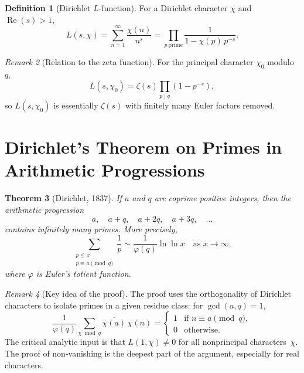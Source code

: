 \documentclass[12pt,a4paper,openany]{book}
\theoremstyle{definition}
\newtheorem{definition}{Definition}[chapter]
\theoremstyle{plain}
\newtheorem{theorem}[definition]{Theorem}
\theoremstyle{remark}
\newtheorem{remark}[definition]{Remark}
\begin{document}
\begin{definition}[Dirichlet $L$-function]
\label{def:dirichlet-L}
For a Dirichlet character $\chi$ and $\operatorname{Re}(s)>1$,
\[
  L(s, \chi) = \sum_{n=1}^{\infty} \frac{\chi(n)}{n^s}
  = \prod_{p\ \mathrm{prime}} \frac{1}{1 - \chi(p)\,p^{-s}}.
\]
\end{definition}

\begin{remark}[Relation to the zeta function]
\label{rem:L-to-zeta}
For the principal character $\chi_0$ modulo~$q$,
\[
  L(s, \chi_0) = \zeta(s) \prod_{p \mid q}(1 - p^{-s}),
\]
so $L(s, \chi_0)$ is essentially $\zeta(s)$ with finitely many Euler factors
removed.
\end{remark}


\section{Dirichlet's Theorem on Primes in Arithmetic Progressions}
\label{sec:dirichlet-theorem}

\begin{theorem}[Dirichlet, 1837]
\label{thm:dirichlet-primes-AP}
If $a$ and $q$ are coprime positive integers, then the arithmetic progression
\[
  a,\quad a + q,\quad a + 2q,\quad a + 3q,\quad \ldots
\]
contains infinitely many primes. More precisely,
\[
  \sum_{\substack{p \leq x \\ p \equiv a \pmod{q}}} \frac{1}{p}
  \sim \frac{1}{\varphi(q)} \ln\ln x
  \quad\text{as } x \to \infty,
\]
where $\varphi$ is Euler's totient function.
\end{theorem}

\begin{remark}[Key idea of the proof]
\label{rem:dirichlet-proof-idea}
The proof uses the orthogonality of Dirichlet characters to isolate primes
in a given residue class: for $\gcd(a,q) = 1$,
\[
  \frac{1}{\varphi(q)} \sum_{\chi \bmod q} \overline{\chi(a)}\, \chi(n)
  = \begin{cases} 1 & \text{if } n \equiv a \pmod{q},\\ 0 & \text{otherwise}.\end{cases}
\]
The critical analytic input is that $L(1, \chi) \neq 0$ for all nonprincipal
characters~$\chi$. The proof of non-vanishing is the deepest part of the
argument, especially for real characters.
\end{remark}
\end{document}
